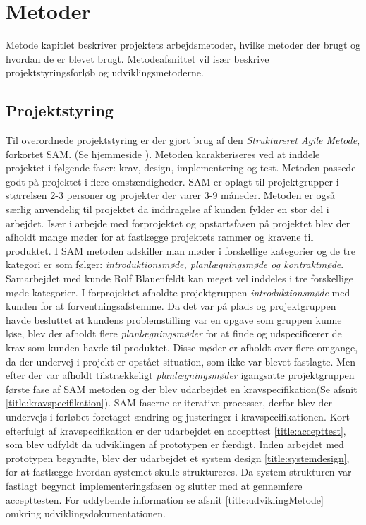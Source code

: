 \chapter{Metoder}
Metode kapitlet beskriver projektets arbejdsmetoder, hvilke metoder der brugt og hvordan de er blevet brugt. Metodeafsnittet vil især beskrive projektstyringsforløb og udviklingsmetoderne. 

\section{Projektstyring} \label{title:projektstyring}
Til overordnede projektstyring er der gjort brug af den \textit{Struktureret Agile Metode}, forkortet SAM. (Se hjemmeside ). Metoden karakteriseres ved at inddele projektet i følgende faser: krav, design, implementering og test. Metoden passede godt på projektet i flere omstændigheder. SAM er oplagt til projektgrupper i størrelsen 2-3 personer og projekter der varer 3-9 måneder. Metoden er også særlig anvendelig til projektet da inddragelse af kunden fylder en stor del i arbejdet. 
Især i arbejde med forprojektet og opstartsfasen på projektet blev der afholdt mange møder for at fastlægge projektets rammer og kravene til produktet. I SAM metoden adskiller man møder i forskellige kategorier og de tre kategori er som følger: \textit{introduktionsmøde, planlægningsmøde og kontraktmøde}. Samarbejdet med kunde Rolf Blauenfeldt kan meget vel inddeles i tre forskellige møde kategorier. I forprojektet afholdte projektgruppen \textit{introduktionsmøde} med kunden for at forventningsafstemme. Da det var på plads og projektgruppen havde besluttet at kundens problemstilling var en opgave som gruppen kunne løse, blev der afholdt flere \textit{planlægningsmøder} for at finde og udspecificerer de  krav som kunden havde til produktet. Disse møder er afholdt over flere omgange, da der undervej i projekt er opstået situation, som ikke var blevet fastlagte. Men efter der var afholdt tilstrækkeligt \textit{planlægningsmøder} igangsatte projektgruppen første fase af SAM metoden og der blev udarbejdet en kravspecifikation(Se afsnit \ref{title:kravspecifikation}). SAM faserne er iterative processer, derfor blev der undervejs i forløbet  foretaget ændring og justeringer i kravspecifikationen. Kort efterfulgt af kravspecifikation er der udarbejdet en accepttest \ref{title:accepttest}, som blev udfyldt da udviklingen af prototypen er færdigt. Inden arbejdet med prototypen begyndte, blev der udarbejdet et system design \ref{title:systemdesign}, for at fastlægge hvordan systemet skulle struktureres. Da system strukturen var fastlagt begyndt implementeringsfasen og slutter med at gennemføre accepttesten. For uddybende information se afsnit \ref{title:udviklingMetode} omkring udviklingsdokumentationen.

